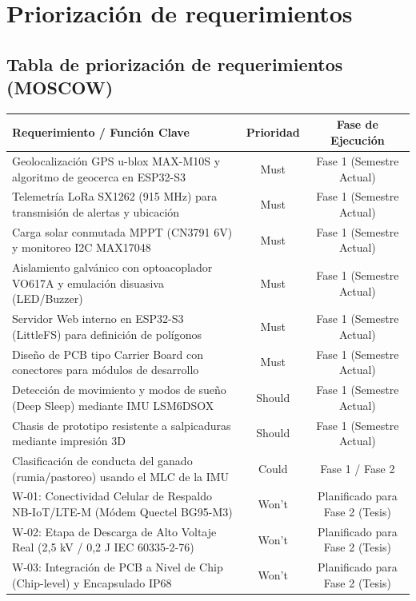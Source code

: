 \section*{Priorización de requerimientos}
\subsection*{Tabla de priorización de requerimientos (MOSCOW)}

\begin{table}[H]
\centering
\small
\begin{tabularx}{\textwidth}{|X c c|}
\hline
\rowcolor{categorybg}
\textbf{Requerimiento / Función Clave} & \textbf{Prioridad} & \textbf{Fase de Ejecución} \\ \hline
Geolocalización GPS u-blox MAX-M10S y algoritmo de geocerca en ESP32-S3 & Must & Fase 1 (Semestre Actual) \\ \hline
Telemetría LoRa SX1262 (915 MHz) para transmisión de alertas y ubicación & Must & Fase 1 (Semestre Actual) \\ \hline
Carga solar conmutada MPPT (CN3791 6V) y monitoreo I2C MAX17048 & Must & Fase 1 (Semestre Actual) \\ \hline
Aislamiento galvánico con optoacoplador VO617A y emulación disuasiva (LED/Buzzer) & Must & Fase 1 (Semestre Actual) \\ \hline
Servidor Web interno en ESP32-S3 (LittleFS) para definición de polígonos & Must & Fase 1 (Semestre Actual) \\ \hline
Diseño de PCB tipo Carrier Board con conectores para módulos de desarrollo & Must & Fase 1 (Semestre Actual) \\ \hline
Detección de movimiento y modos de sueño (Deep Sleep) mediante IMU LSM6DSOX & Should & Fase 1 (Semestre Actual) \\ \hline
Chasis de prototipo resistente a salpicaduras mediante impresión 3D & Should & Fase 1 (Semestre Actual) \\ \hline
Clasificación de conducta del ganado (rumia/pastoreo) usando el MLC de la IMU & Could & Fase 1 / Fase 2 \\ \hline
\rowcolor{phase2orange}
W-01: Conectividad Celular de Respaldo NB-IoT/LTE-M (Módem Quectel BG95-M3) & Won't & Planificado para Fase 2 (Tesis) \\ \hline
\rowcolor{phase2orange}
W-02: Etapa de Descarga de Alto Voltaje Real (2,5 kV / 0,2 J IEC 60335-2-76) & Won't & Planificado para Fase 2 (Tesis) \\ \hline
\rowcolor{phase2orange}
W-03: Integración de PCB a Nivel de Chip (Chip-level) y Encapsulado IP68 & Won't & Planificado para Fase 2 (Tesis) \\ \hline
\end{tabularx}
\end{table}